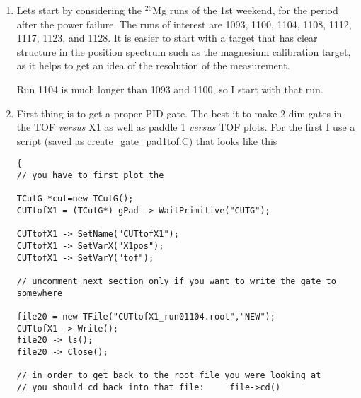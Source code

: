 \documentclass[11pt]{report}
\begin{document}
\begin{enumerate}
The other ODB directory that used to be important, where all the lineshape corrections terms used to
be, now only has 14 entries and looks like this:

\begin{verbatim}
[local:Default:S]main>pwd
/Analyzer/Parameters/main
[local:Default:S]main>ls
x1_driftt_low                   6100
x1_driftt_hi                    8050
x2_driftt_low                   6100
u1_driftt_low                   6100
u2_driftt_low                   6100
x2_driftt_hi                    8050
u2_driftt_hi                    8050
u1_driftt_hi                    8050
lowtof                          2000
hitof                           7000
lowpad1                         0
lowpad2                         0
hipad1                          4096
hipad2                          4096
\end{verbatim}

There should not be any need for you to change anything in the ODB.

\item Lets start by considering the $^{26}$Mg runs of the 1st weekend, for the period after the power failure.
The runs of interest are 1093, 1100, 1104, 1108, 1112, 1117, 1123, and 1128. It is easier to start with a target 
that has clear structure in the position spectrum such as the magnesium calibration target, as it helps to
get an idea of the resolution of the measurement.

Run 1104 is much longer than 1093 and 1100, so I start with that run.
 
\item First thing is to get a proper PID gate.  The best it to make 2-dim gates in the TOF {\it versus} X1 
as well as paddle 1 {\it versus} TOF plots.  For the first I use a script 
(saved as create\_gate\_pad1tof.C) that looks like this
\begin{verbatim}
{
// you have to first plot the

TCutG *cut=new TCutG();
CUTtofX1 = (TCutG*) gPad -> WaitPrimitive("CUTG");

CUTtofX1 -> SetName("CUTtofX1"); 
CUTtofX1 -> SetVarX("X1pos");
CUTtofX1 -> SetVarY("tof");

// uncomment next section only if you want to write the gate to somewhere

file20 = new TFile("CUTtofX1_run01104.root","NEW");
CUTtofX1 -> Write();
file20 -> ls();
file20 -> Close();

// in order to get back to the root file you were looking at
// you should cd back into that file:     file->cd()


\end{verbatim}
\end{enumerate}
\end{document}
